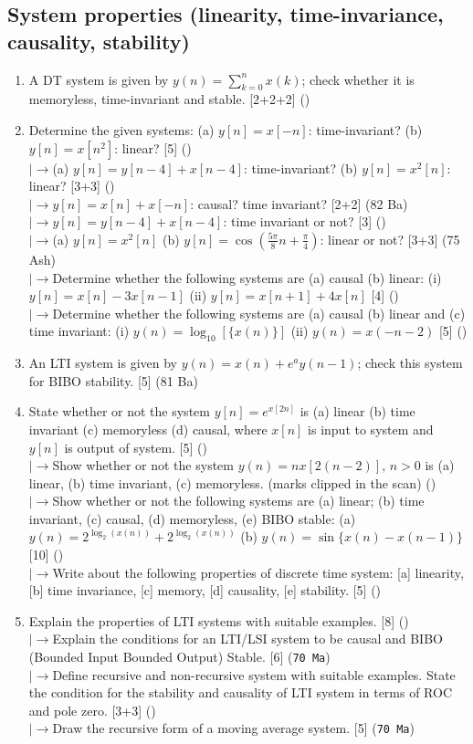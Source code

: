 \documentclass[12pt]{article}
\newcommand{\lb}{\\$\left|\rightarrow\right.$}
\begin{document}
  \subsection{System properties (linearity, time-invariance, causality, stability)}
    \begin{enumerate}[topsep=0pt, noitemsep]
      \item A DT system is given by $y(n)=\sum_{k=0}^{n}x(k)$; check whether it is memoryless, time-invariant and stable. \hfill [2+2+2] ()

      \item Determine the given systems: (a) $y[n]=x[-n]$: time-invariant? (b) $y[n]=x[n^2]$: linear? \hfill [5] ()
        \lb (a) $y[n]=y[n-4]+x[n-4]$: time-invariant? (b) $y[n]=x^2[n]$: linear? \hfill [3+3] ()
        \lb $y[n]=x[n]+x[-n]$: causal? time invariant? \hfill [2+2] (82 Ba)
        \lb $y[n]=y[n-4]+x[n-4]$: time invariant or not? \hfill [3] ()
        \lb (a) $y[n]=x^2[n]$ (b) $y[n]=\cos(\tfrac{5\pi}{8}n+\tfrac{\pi}{4})$: linear or not? \hfill [3+3] (75 Ash)
        \lb Determine whether the following systems are (a) causal (b) linear: (i) $y[n]=x[n]-3x[n-1]$ \quad (ii) $y[n]=x[n+1]+4x[n]$ \hfill [4] ()
        \lb Determine whether the following systems are (a) causal (b) linear and (c) time invariant: (i) $y(n)=\log_{10}[\{x(n)\}]$ \quad (ii) $y(n)=x(-n-2)$ \hfill [5] ()

      \item An LTI system is given by $y(n)=x(n)+e^{a}y(n-1)$; check this system for BIBO stability. \hfill [5] (81 Ba)

      \item State whether or not the system $y[n]=e^{x[2n]}$ is (a) linear (b) time invariant (c) memoryless (d) causal, where $x[n]$ is input to system and $y[n]$ is output of system. \hfill [5] ()
        \lb Show whether or not the system $y(n)=nx[2(n-2)]$, $n>0$ is (a) linear, (b) time invariant, (c) memoryless. \hfill (marks clipped in the scan) ()
        \lb Show whether or not the following systems are (a) linear; (b) time invariant, (c) causal, (d) memoryless, (e) BIBO stable: (a) $y(n)=2^{\log_2(x(n))}+2^{\log_2(x(n))}$ \quad (b) $y(n)=\sin\{x(n)-x(n-1)\}$ \hfill [10] ()
        \lb Write about the following properties of discrete time system: [a] linearity, [b] time invariance, [c] memory, [d] causality, [e] stability. \hfill [5] ()

      \item Explain the properties of LTI systems with suitable examples. \hfill [8] ()
        \lb Explain the conditions for an LTI/LSI system to be causal and BIBO (Bounded Input Bounded Output) Stable. \hfill [6] (\texttt{70 Ma})
        \lb Define recursive and non-recursive system with suitable examples. State the condition for the stability and causality of LTI system in terms of ROC and pole zero. \hfill [3+3] ()
        \lb Draw the recursive form of a moving average system. \hfill [5] (\texttt{70 Ma})
    \end{enumerate}
\end{document}

